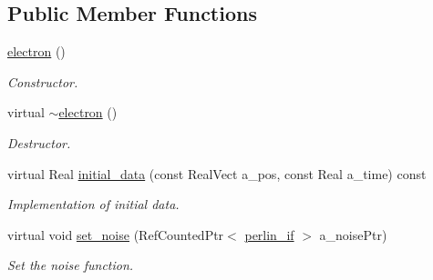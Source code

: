 \subsection*{Public Member Functions}
\begin{DoxyCompactItemize}
\item 
\hyperlink{classmorrow__lowke_1_1electron_ac5586d59c4b81f7c6adfe17328f482a9}{electron} ()
\begin{DoxyCompactList}\small\item\em Constructor. \end{DoxyCompactList}\item 
virtual \hyperlink{classmorrow__lowke_1_1electron_af53a0d96fbefd5aaa6d90635396b42c3}{$\sim$electron} ()
\begin{DoxyCompactList}\small\item\em Destructor. \end{DoxyCompactList}\item 
virtual Real \hyperlink{classmorrow__lowke_1_1electron_a6f29072ccc50f58ae1670bf9e549463d}{initial\+\_\+data} (const Real\+Vect a\+\_\+pos, const Real a\+\_\+time) const 
\begin{DoxyCompactList}\small\item\em Implementation of initial data. \end{DoxyCompactList}\item 
virtual void \hyperlink{classmorrow__lowke_1_1electron_ac327de55b5fe0e11748c72866c2d7efb}{set\+\_\+noise} (Ref\+Counted\+Ptr$<$ \hyperlink{classperlin__if}{perlin\+\_\+if} $>$ a\+\_\+noise\+Ptr)
\begin{DoxyCompactList}\small\item\em Set the noise function. \end{DoxyCompactList}\end{DoxyCompactItemize}
